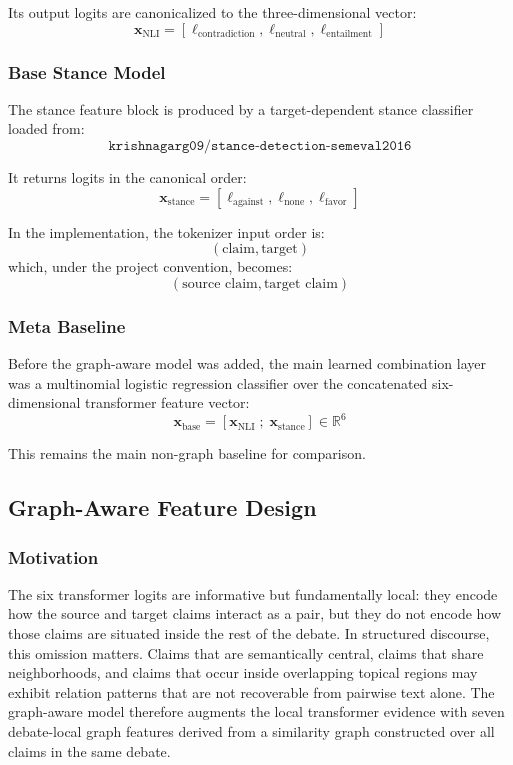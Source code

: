 \documentclass[11pt,a4paper]{article}
\begin{document}
Its output logits are canonicalized to the three-dimensional vector:
\begin{equation}
\mathbf{x}_{\text{NLI}} = [\ell_{\text{contradiction}}, \ell_{\text{neutral}}, \ell_{\text{entailment}}]
\end{equation}

\subsubsection{Base Stance Model}
The stance feature block is produced by a target-dependent stance classifier loaded from:
\[
\texttt{krishnagarg09/stance-detection-semeval2016}
\]

It returns logits in the canonical order:
\begin{equation}
\mathbf{x}_{\text{stance}} = [\ell_{\text{against}}, \ell_{\text{none}}, \ell_{\text{favor}}]
\end{equation}

In the implementation, the tokenizer input order is:
\[
(\text{claim}, \text{target})
\]
which, under the project convention, becomes:
\[
(\text{source claim}, \text{target claim})
\]

\subsubsection{Meta Baseline}
Before the graph-aware model was added, the main learned combination layer was a multinomial logistic regression classifier over the concatenated six-dimensional transformer feature vector:
\begin{equation}
\mathbf{x}_{\text{base}} =
\left[
\mathbf{x}_{\text{NLI}} \; ; \; \mathbf{x}_{\text{stance}}
\right]
\in \mathbb{R}^{6}
\end{equation}

This remains the main non-graph baseline for comparison.

\subsection{Graph-Aware Feature Design}
\subsubsection{Motivation}
The six transformer logits are informative but fundamentally local: they encode how the source and target claims interact as a pair, but they do not encode how those claims are situated inside the rest of the debate. In structured discourse, this omission matters. Claims that are semantically central, claims that share neighborhoods, and claims that occur inside overlapping topical regions may exhibit relation patterns that are not recoverable from pairwise text alone. The graph-aware model therefore augments the local transformer evidence with seven debate-local graph features derived from a similarity graph constructed over all claims in the same debate.
\end{document}
